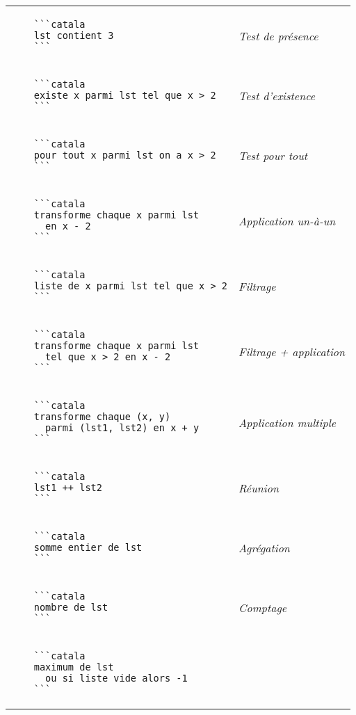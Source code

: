 \documentclass{article}
\makeatletter
\newenvironment{catala}{%
  \VerbatimEnvironment
  \let\FV@ListVSpace\relax
  \begin{verbatim}}%
 {\end{verbatim}}
\makeatother
\begin{document}
\begin{multicols}{3}
\begin{tabular}{@{}p{\cola}>{\slshape}p{\colb}@{}}
  \begin{catala}
    ```catala
    lst contient 3
    ```
  \end{catala}
  & Test de présence
  \\
  \begin{catala}
    ```catala
    existe x parmi lst tel que x > 2
    ```
  \end{catala}
  & Test d'existence
  \\
  \begin{catala}
    ```catala
    pour tout x parmi lst on a x > 2
    ```
  \end{catala}
  & Test pour tout
  \\
  \begin{catala}
    ```catala
    transforme chaque x parmi lst
      en x - 2
    ```
  \end{catala}
  & Application un-à-un
  \\
  \begin{catala}
    ```catala
    liste de x parmi lst tel que x > 2
    ```
  \end{catala}
  & Filtrage
  \\
  \begin{catala}
    ```catala
    transforme chaque x parmi lst
      tel que x > 2 en x - 2
    ```
  \end{catala}
  & Filtrage + application
  \\
  \begin{catala}
    ```catala
    transforme chaque (x, y)
      parmi (lst1, lst2) en x + y
    ```
  \end{catala}
  & Application multiple
  \\
  \begin{catala}
    ```catala
    lst1 ++ lst2
    ```
  \end{catala}
  & Réunion
  \\
  \begin{catala}
    ```catala
    somme entier de lst
    ```
  \end{catala}
  & Agrégation
  \\
  \begin{catala}
    ```catala
    nombre de lst
    ```
  \end{catala}
  & Comptage
  \\
  \begin{catala}
    ```catala
    maximum de lst
      ou si liste vide alors -1
    ```
  \end{catala}

\end{tabular}
\end{multicols}
\end{document}

